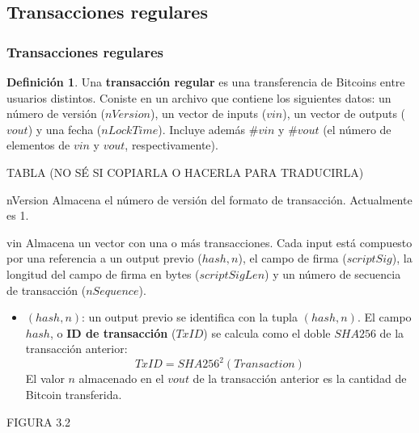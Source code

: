 \documentclass{beamer}
\theoremstyle{definition}
\newtheorem{defi}{Definición}
\begin{document}
\subsection{Transacciones regulares}
\begin{frame}
\frametitle{Transacciones regulares}
\begin{defi}
	Una \textbf{transacción regular} es una transferencia de Bitcoins entre usuarios distintos. Coniste en un archivo que contiene los siguientes datos: un número de versión ($nVersion$), un vector de inputs ($vin$), un vector de outputs ($vout$) y una fecha ($nLockTime$). Incluye además $\# vin$ y $\# vout$ (el número de elementos de $vin$ y $vout$, respectivamente). 
\end{defi}

\end{frame}

\begin{frame}
	TABLA (NO SÉ SI COPIARLA O HACERLA PARA TRADUCIRLA)
\end{frame}


\begin{frame}
	\begin{block}{nVersion}
		Almacena el número de versión del formato de transacción. Actualmente es 1.
	\end{block}\pause

\begin{block}{vin}
	Almacena un vector con una o más transacciones. Cada input está compuesto por una referencia a un output previo ($hash,n$), el campo de firma ($scriptSig$), la longitud del campo de firma en bytes ($scriptSigLen$) y un número de secuencia de transacción ($nSequence$).
\end{block}
\end{frame}

\begin{frame}
\begin{itemize}
	\item<1-> $(hash,n)$: un output previo se identifica con la tupla $(hash,n)$. El campo $hash$, o \textbf{ID de transacción} ($TxID$) se calcula como el doble $SHA256$ de la transacción anterior: $$TxID=SHA256^2(Transaction)$$
	El valor $n$ almacenado en el $vout$ de la transacción anterior es la cantidad de Bitcoin transferida.
\end{itemize}
\end{frame}

\begin{frame}
	FIGURA 3.2
\end{frame}
\end{document}
